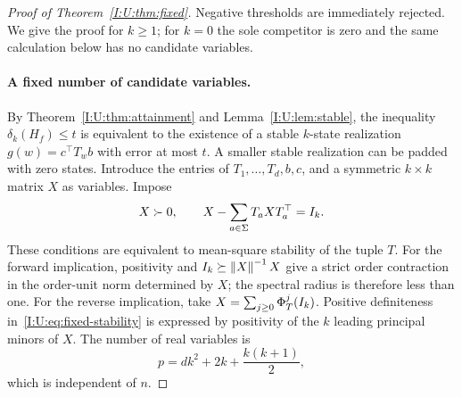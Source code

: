 \begin{proof}[Proof of Theorem~\ref{I:U:thm:fixed}]
Negative thresholds are immediately rejected.  We give the proof for
$k\ge1$; for $k=0$ the sole competitor is zero and the same calculation
below has no candidate variables.

\paragraph{A fixed number of candidate variables.}
By Theorem~\ref{I:U:thm:attainment} and Lemma~\ref{I:U:lem:stable}, the inequality
$\delta_k(H_f)\le t$ is equivalent to the existence of a stable
$k$-state realization $g(w)=c^\top T_wb$ with error at most $t$.
A smaller stable realization can be padded with zero states.
Introduce the entries of $T_1,\ldots,T_d,b,c$, and a symmetric
$k\times k$ matrix $X$ as variables.  Impose
\begin{equation}\label{I:U:eq:fixed-stability}
 X\succ0,\qquad X-\sum_{a\in\Sigma}T_aXT_a^\top=I_k.
\end{equation}
These conditions are equivalent to mean-square stability of the tuple
$T$.  For the forward implication, positivity and
$I_k\succeq \left\lVert X\right\rVert^{-1}X$ give a strict order contraction in the
order-unit norm determined by $X$; the spectral radius is therefore less
than one.  For the reverse implication, take
$X=\sum_{j\ge0}\Phi_T^j(I_k)$.
Positive definiteness in~\eqref{I:U:eq:fixed-stability} is expressed by
positivity of the $k$ leading principal minors of $X$.
The number of real variables is
\begin{equation}\label{I:U:eq:fixed-varcount}
 p=dk^2+2k+\frac{k(k+1)}2,
\end{equation}
which is independent of $n$.


\end{proof}
